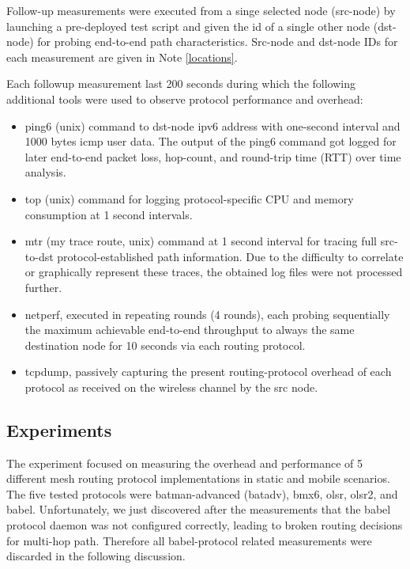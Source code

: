 \documentclass[a4paper,12pt,twoside]{article}
\begin{document}
Follow-up measurements were executed from a singe selected node
(src-node) by launching a pre-deployed test script \cite{wbm-test} and
given the id of a single other node (dst-node) for probing end-to-end
path characteristics. Src-node and dst-node IDs for each measurement
are given in Note \ref{locations}.

Each followup measurement last 200 seconds during which the following
additional tools were used to observe protocol performance and
overhead: 
\begin{itemize}
\item ping6 (unix) command to dst-node ipv6 address with one-second interval
  and 1000 bytes icmp user data. The output of the ping6 command got
  logged for later end-to-end packet loss, hop-count, and round-trip
  time (RTT) over time analysis.

\item top (unix) command for logging protocol-specific CPU and memory
  consumption at 1 second intervals.

\item mtr (my trace route, unix) command at 1 second interval for
  tracing full src-to-dst protocol-established path information. Due
  to the difficulty to correlate or graphically represent these traces,
  the obtained log files were not processed further.

\item netperf, executed in repeating rounds (4 rounds), each probing
  sequentially the maximum achievable end-to-end throughput to always
  the same destination node for 10 seconds via each routing protocol.
  
\item tcpdump, passively capturing the present routing-protocol
  overhead of each protocol as received on the wireless channel by the
  src node.

\end{itemize}

\subsection{Experiments}

The experiment focused on measuring the overhead and performance of 5
different mesh routing protocol implementations in static and mobile
scenarios. The five tested protocols were batman-advanced (batadv),
bmx6, olsr, olsr2, and babel. Unfortunately, we just discovered after
the measurements that the babel protocol daemon was not configured
correctly, leading to broken routing decisions for multi-hop
path. Therefore all babel-protocol related measurements were discarded
in the following discussion.
\end{document}
